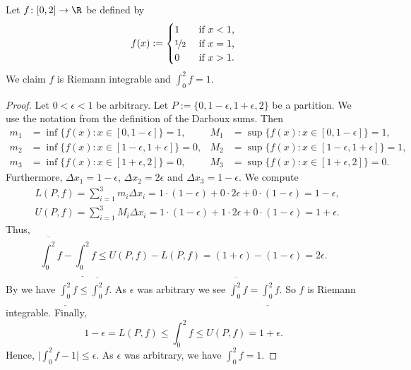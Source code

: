 \documentclass[12pt]{book}
\begin{document}
\begin{example}
Let $f \colon [0,2] \to \R$ be defined by
\begin{equation*}
f(x) :=
\begin{cases}
1 & \text{ if $x < 1$,}\\
\nicefrac{1}{2} & \text{ if $x = 1$,}\\
0 & \text{ if $x > 1$.}
\end{cases}
\end{equation*}
We claim $f$ is Riemann integrable and $\int_0^2 f = 1$.

\begin{proof} Let $0 < \epsilon < 1$ be arbitrary.
Let $P := \{0, 1-\epsilon, 1+\epsilon, 2\}$ be a partition.
We use the notation from
the definition of the Darboux sums.
Then
\begin{align*}
m_1 &= \inf \{ f(x) : x \in [0,1-\epsilon] \} = 1 , & 
M_1 &= \sup \{ f(x) : x \in [0,1-\epsilon] \} = 1 , \\
m_2 &= \inf \{ f(x) : x \in [1-\epsilon,1+\epsilon] \} = 0 , & 
M_2 &= \sup \{ f(x) : x \in [1-\epsilon,1+\epsilon] \} = 1 , \\
m_3 &= \inf \{ f(x) : x \in [1+\epsilon,2] \} = 0 , & 
M_3 &= \sup \{ f(x) : x \in [1+\epsilon,2] \} = 0 .
\end{align*}
Furthermore, $\Delta x_1 = 1-\epsilon$, $\Delta x_2 = 2\epsilon$ and
$\Delta x_3 = 1-\epsilon$.
We compute
\begin{align*}
& L(P,f) = \sum_{i=1}^3 m_i \Delta x_i =
1 \cdot (1-\epsilon) + 0 \cdot 2\epsilon + 0 \cdot (1-\epsilon)
= 1-\epsilon , \\
& U(P,f) = \sum_{i=1}^3 M_i \Delta x_i =
1 \cdot (1-\epsilon) + 1 \cdot 2\epsilon + 0 \cdot (1-\epsilon)
= 1+\epsilon .
\end{align*}
Thus,
\begin{equation*}
\overline{\int_0^2} f - 
\underline{\int_0^2} f
\leq
U(P,f) - L(P,f)
=
(1+\epsilon)
- (1-\epsilon) = 2 \epsilon .
\end{equation*}
By  we have $\underline{\int_0^2} f \leq \overline{\int_0^2} f$.
As $\epsilon$ was arbitrary we see 
$\overline{\int_0^2} f = \underline{\int_0^2} f$.
So $f$ is Riemann
integrable.
Finally,
\begin{equation*}
1-\epsilon = L(P,f) \leq \int_0^2 f \leq U(P,f) =
1+\epsilon.
\end{equation*}
Hence, $\bigl\lvert \int_0^2 f - 1 \bigr\rvert \leq \epsilon$.
As $\epsilon$ was arbitrary,
we have $\int_0^2 f = 1$.
\end{proof}
\end{example}
\end{document}

